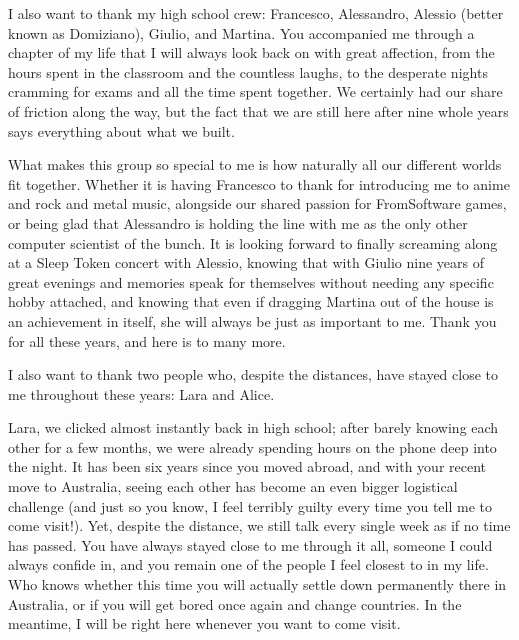 \documentclass[english, oneside]{sapthesis}
\begin{document}
\begin{acknowledgments}
\medskip

I also want to thank my high school crew: Francesco, Alessandro, Alessio (better known as Domiziano), Giulio, and Martina. You accompanied me through a chapter of my life that I will always look back on with great affection, from the hours spent in the classroom and the countless laughs, to the desperate nights cramming for exams and all the time spent together. We certainly had our share of friction along the way, but the fact that we are still here after nine whole years says everything about what we built.

What makes this group so special to me is how naturally all our different worlds fit together. Whether it is having Francesco to thank for introducing me to anime and rock and metal music, alongside our shared passion for FromSoftware games, or being glad that Alessandro is holding the line with me as the only other computer scientist of the bunch. It is looking forward to finally screaming along at a Sleep Token concert with Alessio, knowing that with Giulio nine years of great evenings and memories speak for themselves without needing any specific hobby attached, and knowing that even if dragging Martina out of the house is an achievement in itself, she will always be just as important to me. Thank you for all these years, and here is to many more.

\medskip

I also want to thank two people who, despite the distances, have stayed close to me throughout these years: Lara and Alice.

\medskip

Lara, we clicked almost instantly back in high school; after barely knowing each other for a few months, we were already spending hours on the phone deep into the night. It has been six years since you moved abroad, and with your recent move to Australia, seeing each other has become an even bigger logistical challenge (and just so you know, I feel terribly guilty every time you tell me to come visit!). Yet, despite the distance, we still talk every single week as if no time has passed. You have always stayed close to me through it all, someone I could always confide in, and you remain one of the people I feel closest to in my life. Who knows whether this time you will actually settle down permanently there in Australia, or if you will get bored once again and change countries. In the meantime, I will be right here whenever you want to come visit.

\medskip


\end{acknowledgments}
\end{document}
